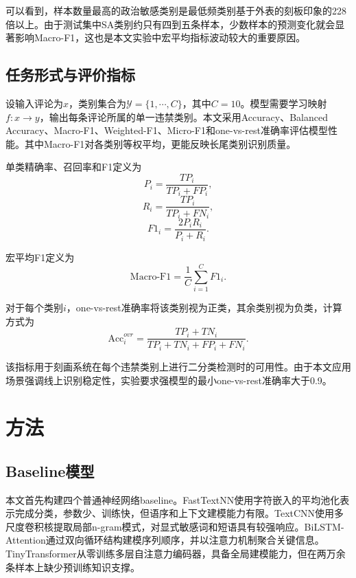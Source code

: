 \documentclass[UTF8, fontset=windows]{ctexart}
\begin{document}
	可以看到，样本数量最高的政治敏感类别是最低频类别基于外表的刻板印象的228倍以上。由于测试集中SA类别约只有四到五条样本，少数样本的预测变化就会显著影响Macro-F1，这也是本文实验中宏平均指标波动较大的重要原因。
	
	\subsection{任务形式与评价指标}
	
	设输入评论为$x$，类别集合为$\mathcal{Y}=\{1,\cdots,C\}$，其中$C=10$。模型需要学习映射$f:x\rightarrow y$，输出每条评论所属的单一违禁类别。本文采用Accuracy、Balanced Accuracy、Macro-F1、Weighted-F1、Micro-F1和one-vs-rest准确率评估模型性能。其中Macro-F1对各类别等权平均，更能反映长尾类别识别质量。
	
	单类精确率、召回率和F1定义为
	\begin{equation}
		P_i=\frac{TP_i}{TP_i+FP_i},
		\label{eq:precision}
	\end{equation}
	\begin{equation}
		R_i=\frac{TP_i}{TP_i+FN_i},
		\label{eq:recall}
	\end{equation}
	\begin{equation}
		F1_i=\frac{2P_iR_i}{P_i+R_i}.
		\label{eq:f1}
	\end{equation}
	
	宏平均F1定义为
	\begin{equation}
		\mathrm{Macro\text{-}F1}=\frac{1}{C}\sum_{i=1}^{C}F1_i.
		\label{eq:macro_f1}
	\end{equation}
	
	对于每个类别$i$，one-vs-rest准确率将该类别视为正类，其余类别视为负类，计算方式为
	\begin{equation}
		\mathrm{Acc}^{ovr}_i=\frac{TP_i+TN_i}{TP_i+TN_i+FP_i+FN_i}.
		\label{eq:ovr_acc}
	\end{equation}
	
	该指标用于刻画系统在每个违禁类别上进行二分类检测时的可用性。由于本文应用场景强调线上识别稳定性，实验要求强模型的最小one-vs-rest准确率大于0.9。
	
	\section{方法}
	
	\subsection{Baseline模型}
	
	本文首先构建四个普通神经网络baseline。FastTextNN使用字符嵌入的平均池化表示完成分类，参数少、训练快，但语序和上下文建模能力有限。TextCNN使用多尺度卷积核提取局部n-gram模式，对显式敏感词和短语具有较强响应。BiLSTM-Attention通过双向循环结构建模序列顺序，并以注意力机制聚合关键信息。TinyTransformer从零训练多层自注意力编码器，具备全局建模能力，但在两万余条样本上缺少预训练知识支撑。
	
\end{document}
